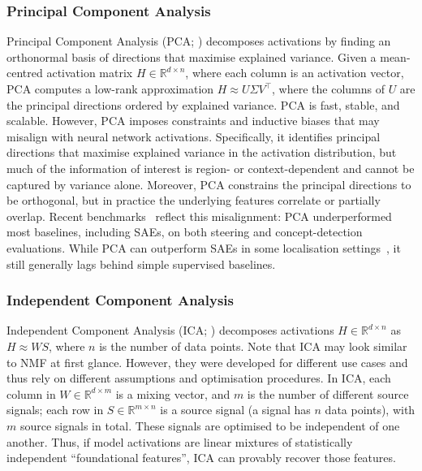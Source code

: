 \subsubsection{Principal Component Analysis}
Principal Component Analysis (PCA; ) decomposes activations by finding an orthonormal basis of directions that maximise explained variance. Given a mean-centred activation matrix $H \in \mathbb{R}^{d \times n}$, where each column is an activation vector, PCA computes a low-rank approximation $H \approx U \Sigma V^\top$, where the columns of $U$ are the principal directions ordered by explained variance. PCA is fast, stable, and scalable. However, PCA imposes constraints and inductive biases that may misalign with neural network activations. Specifically, it identifies principal directions that maximise explained variance in the activation distribution, but much of the information of interest is region- or context-dependent and cannot be captured by variance alone. Moreover, PCA constrains the principal directions to be orthogonal, but in practice the underlying features correlate or partially overlap. Recent benchmarks~ reflect this misalignment: PCA underperformed most baselines, including SAEs, on both steering and concept-detection evaluations. While PCA can outperform SAEs in some localisation settings~, it still generally lags behind simple supervised baselines.

\subsubsection{Independent Component Analysis}

Independent Component Analysis (ICA; ) decomposes activations $H \in \mathbb{R}^{d \times n}$ as $H \approx WS$, where $n$ is the number of data points. Note that ICA may look similar to NMF at first glance. However, they were developed for different use cases and thus rely on different assumptions and optimisation procedures. In ICA, each column in $W \in \mathbb{R}^{d \times m}$ is a mixing vector, and $m$ is the number of different source signals; each row in $S \in \mathbb{R}^{m \times n}$ is a source signal (a signal has $n$ data points), with $m$ source signals in total. These signals are optimised to be independent of one another. Thus, if model activations are linear mixtures of statistically independent ``foundational features'', ICA can provably recover those features.

